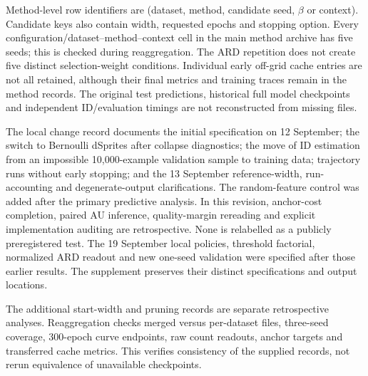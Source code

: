\documentclass[make,article,submit,pdftex,moreauthors]{Definitions/mdpi}
\begin{document}
Method-level row identifiers are
(dataset, method, candidate seed, $\beta$ or context). Candidate keys
also contain width, requested epochs and stopping option. Every
configuration/dataset--method--context cell in the main method archive
has five seeds; this is checked during reaggregation. The ARD repetition
does not create five distinct selection-weight conditions. Individual
early off-grid cache entries are not all retained, although their final
metrics and training traces remain in the method records. The original
test predictions, historical full model checkpoints and independent ID/evaluation
timings are not reconstructed from missing files.

The local change record documents the initial specification on
12 September; the switch to Bernoulli dSprites after collapse diagnostics;
the move of ID estimation from an impossible 10,000-example validation
sample to training data; trajectory runs without early stopping; and
the 13 September reference-width, run-accounting and degenerate-output
clarifications. The random-feature control was added after the primary
predictive analysis. In this revision, anchor-cost completion, paired AU
inference, quality-margin rereading and explicit implementation auditing
are retrospective. None is relabelled as a publicly preregistered test.
The 19 September local policies, threshold factorial, normalized ARD
readout and new one-seed validation were specified after those earlier
results. The supplement preserves their distinct specifications and
output locations.

The additional start-width and pruning records are separate retrospective
analyses. Reaggregation checks merged versus per-dataset files, three-seed
coverage, 300-epoch curve endpoints, raw count readouts, anchor targets
and transferred cache metrics. This verifies consistency of the supplied
records, not rerun equivalence of unavailable checkpoints.
\end{document}
